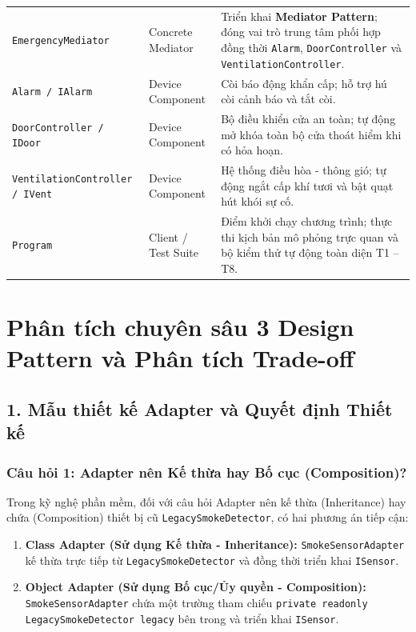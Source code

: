 \documentclass[11pt,a4paper]{article}
\begin{document}
\begin{table}[H]
\begin{tabular}{>{\raggedright\arraybackslash}p{4.8cm}p{2.5cm}p{7.7cm}}
\texttt{\small EmergencyMediator} & Concrete Mediator & Triển khai \textbf{Mediator Pattern}; đóng vai trò trung tâm phối hợp đồng thời \texttt{Alarm}, \texttt{DoorController} và \texttt{VentilationController}. \\
\texttt{\small Alarm / IAlarm} & Device Component & Còi báo động khẩn cấp; hỗ trợ hú còi cảnh báo và tắt còi. \\
\texttt{\small DoorController / IDoor} & Device Component & Bộ điều khiển cửa an toàn; tự động mở khóa toàn bộ cửa thoát hiểm khi có hỏa hoạn. \\
\texttt{\small VentilationController / IVent} & Device Component & Hệ thống điều hòa - thông gió; tự động ngắt cấp khí tươi và bật quạt hút khói sự cố. \\
\texttt{\small Program} & Client / Test Suite & Điểm khởi chạy chương trình; thực thi kịch bản mô phỏng trực quan và bộ kiểm thử tự động toàn diện T1 -- T8. \\
\bottomrule
\end{tabular}
\end{table}

\newpage

\section{Phân tích chuyên sâu 3 Design Pattern và Phân tích Trade-off}



\subsection{1. Mẫu thiết kế Adapter và Quyết định Thiết kế}

\subsubsection{Câu hỏi 1: Adapter nên Kế thừa hay Bố cục (Composition)?}
Trong kỹ nghệ phần mềm, đối với câu hỏi Adapter nên kế thừa (Inheritance) hay chứa (Composition) thiết bị cũ \texttt{LegacySmokeDetector}, có hai phương án tiếp cận:
\begin{enumerate}
    \item \textbf{Class Adapter (Sử dụng Kế thừa - Inheritance):} \texttt{SmokeSensorAdapter} kế thừa trực tiếp từ \texttt{LegacySmokeDetector} và đồng thời triển khai \texttt{ISensor}.
    \item \textbf{Object Adapter (Sử dụng Bố cục/Ủy quyền - Composition):} \texttt{SmokeSensorAdapter} chứa một trường tham chiếu \texttt{private readonly LegacySmokeDetector legacy} bên trong và triển khai \texttt{ISensor}.
\end{enumerate}
\end{document}

